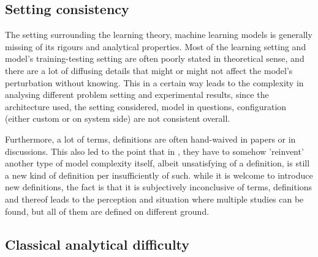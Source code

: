 \documentclass[twoside,10pt]{article}
\begin{document}
\subsection{Setting consistency}

The setting surrounding the learning theory, machine learning models is generally missing of its rigours and analytical properties. Most of the learning setting and model's training-testing setting are often poorly stated in theoretical sense, and there are a lot of diffusing details that might or might not affect the model's perturbation without knowing. This in a certain way leads to the complexity in analysing different problem setting and experimental results, since the architecture used, the setting considered, model in questions, configuration (either custom or on system side) are not consistent overall. 

Furthermore, a lot of terms, definitions are often hand-waived in papers or in discussions. This also led to the point that in \cite{nakkiran_deep_2019}, they have to somehow 'reinvent' another type of model complexity itself, albeit unsatisfying of a definition, is still a new kind of definition per insufficiently of such. while it is welcome to introduce new definitions, the fact is that it is subjectively inconclusive of terms, definitions and thereof leads to the perception and situation where multiple studies can be found, but all of them are defined on different ground.

\subsection{Classical analytical difficulty}
\end{document}
